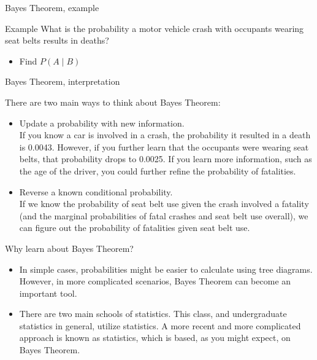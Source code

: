 \documentclass[xcolor=table, aspectratio=169, bigger, handout]{beamer}
\begin{document}
\begin{frame}{Bayes Theorem, example}
\begin{exampleblock}{Example}
What is the probability a motor vehicle crash with occupants wearing seat belts results in deaths?\\ \smallskip
{} \smallskip

\begin{itemize}
\pause\item Find $P(A \mid B)$ \\ \smallskip
\pause{} \medskip
\pause{}
\end{itemize}

\end{exampleblock}
\end{frame}

\begin{frame}{Bayes Theorem, interpretation}
\begin{block}{}
There are two main ways to think about Bayes Theorem:

\begin{itemize}
\pause\item Update a probability with new information.\\ \smallskip
If you know a car is involved in a crash, the probability it resulted in a death is 0.0043. However, if you further learn that the occupants were wearing seat belts, that probability drops to 0.0025. If you learn more information, such as the age of the driver, you could further refine the probability of fatalities.

\pause\item Reverse a known conditional probability.\\ \smallskip
If we know the probability of seat belt use given the crash involved a fatality (and the marginal probabilities of fatal crashes and seat belt use overall), we can figure out the probability of fatalities given seat belt use.
\end{itemize}
\end{block}
\end{frame}

\begin{frame}{Why learn about Bayes Theorem?}
\begin{block}{}
\begin{itemize}
\item In simple cases, probabilities might be easier to calculate using tree diagrams. However, in more complicated scenarios, Bayes Theorem can become an important tool.

\pause\item There are two main schools of statistics. This class, and undergraduate statistics in general, utilize  statistics. A more recent and more complicated approach is known as  statistics, which is based, as you might expect, on Bayes Theorem. 
\end{itemize}
\end{block}
\end{frame}
\end{document}
